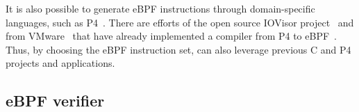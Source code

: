 It is also possible to generate eBPF instructions through domain-specific languages, such as P4~\cite{Bosshart:2014:P4}.
There are efforts of the open source IOVisor project~\cite{IOvisor} and from VMware~\cite{p4c-xdp2018} that have already implemented a compiler from P4 to eBPF~\cite{P42EBPF2015}.
Thus, by choosing the eBPF instruction set, \system can also leverage previous C and P4 projects and applications.






\subsection{eBPF verifier}
\label{sec:verifier}

